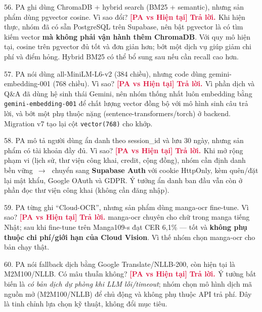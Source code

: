 \documentclass[11pt]{article}
\newcommand{\arr}{\,\ensuremath{\rightarrow}\,}
\newcommand{\tagBoth}{\textcolor{crimson}{\footnotesize\textbf{[PA vs Hiện tại]}}}
\newcommand{\A}{\textbf{\textcolor{crimson}{Trả lời. }}}
\begin{document}
\begin{qa}{56. PA ghi dùng ChromaDB + hybrid search (BM25 + semantic), nhưng sản phẩm dùng pgvector cosine. Vì sao đổi? \tagBoth}
\A Khi hiện thực, nhóm đã có sẵn PostgreSQL trên Supabase, nên bật pgvector là có tìm kiếm vector \textbf{mà không phải vận hành thêm ChromaDB}. Với quy mô hiện tại, cosine trên pgvector đủ tốt và đơn giản hơn; bớt một dịch vụ giúp giảm chi phí và điểm hỏng. Hybrid BM25 có thể bổ sung sau nếu cần recall cao hơn.
\end{qa}

\begin{qa}{57. PA nói dùng all-MiniLM-L6-v2 (384 chiều), nhưng code dùng gemini-embedding-001 (768 chiều). Vì sao? \tagBoth}
\A Vì phần dịch và Q\&A đã dùng hệ sinh thái Gemini, nên nhóm thống nhất luôn embedding bằng \texttt{gemini-embedding-001} để chất lượng vector đồng bộ với mô hình sinh câu trả lời, và bớt một phụ thuộc nặng (sentence-transformers/torch) ở backend. Migration v7 tạo lại cột \texttt{vector(768)} cho khớp.
\end{qa}

\begin{qa}{58. PA mô tả người dùng ẩn danh theo session\_id và lưu 30 ngày, nhưng sản phẩm có tài khoản đầy đủ. Vì sao? \tagBoth}
\A Khi mở rộng phạm vi (lịch sử, thư viện công khai, credit, cộng đồng), nhóm cần định danh bền vững \arr\ chuyển sang \textbf{Supabase Auth} với cookie HttpOnly, kèm quên/đặt lại mật khẩu, Google OAuth và GDPR. Ý tưởng ẩn danh ban đầu vẫn còn ở phần đọc thư viện công khai (không cần đăng nhập).
\end{qa}

\begin{qa}{59. PA từng ghi ``Cloud-OCR'', nhưng sản phẩm dùng manga-ocr fine-tune. Vì sao? \tagBoth}
\A manga-ocr chuyên cho chữ trong manga tiếng Nhật; sau khi fine-tune trên Manga109-s đạt CER 6,1\% --- tốt và \textbf{không phụ thuộc chi phí/giới hạn của Cloud Vision}. Vì thế nhóm chọn manga-ocr cho bản chạy thật.
\end{qa}

\begin{qa}{60. PA nói fallback dịch bằng Google Translate/NLLB-200, còn hiện tại là M2M100/NLLB. Có mâu thuẫn không? \tagBoth}
\A Ý tưởng bất biến là \textit{có bản dịch dự phòng khi LLM lỗi/timeout}; nhóm chọn mô hình dịch mã nguồn mở (M2M100/NLLB) để chủ động và không phụ thuộc API trả phí. Đây là tinh chỉnh lựa chọn kỹ thuật, không đổi mục tiêu.
\end{qa}
\end{document}
